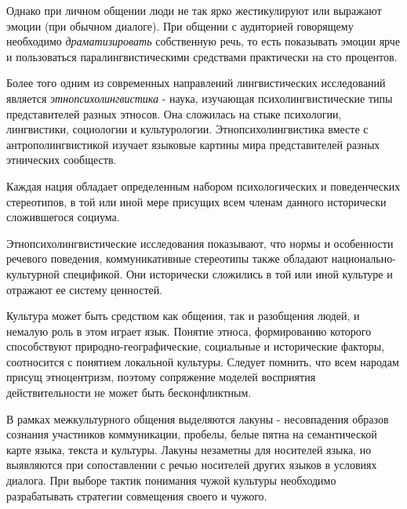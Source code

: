  Однако при личном общении люди не так ярко жестикулируют или выражают эмоции (при обычном диалоге). 
 При общении с аудиторией говорящему необходимо \textit{драматизировать} собственную речь, то есть показывать эмоции ярче и пользоваться паралингвистическими
 средствами практически на сто процентов.
 
 Более того одним из современных направлений лингвистических исследований является
 \textit{этнопсихолингвистика} - наука, изучающая психолингвистические типы представителей разных этносов. Она сложилась на стыке психологии, лингвистики, социологии и культурологии.
 Этнопсихолингвистика вместе с антрополингвистикой изучает языковые картины мира представителей разных этнических сообществ.
 
 Каждая нация обладает определенным набором психологических и поведенческих стереотипов, в той или иной мере присущих всем членам данного исторически сложившегося
 социума. 
 
 Этнопсихолингвистические исследования показывают, что нормы и особенности речевого поведения, коммуникативные стереотипы также обладают национально-культурной
 спецификой. Они исторически сложились в той или иной культуре и отражают ее систему
 ценностей.
 
 Культура может быть средством как общения, так и разобщения людей, и немалую роль в этом играет язык.
 Понятие этноса, формированию которого способствуют
 природно-географические, социальные и исторические факторы, соотносится с понятием локальной культуры. Следует помнить, что всем народам присущ этноцентризм, поэтому сопряжение моделей восприятия действительности не может быть бесконфликтным.
 
 В рамках межкультурного общения выделяются лакуны - несовпадения образов сознания участников коммуникации, пробелы, белые пятна на семантической карте языка, текста и
 культуры. Лакуны незаметны для носителей языка, но выявляются при сопоставлении с речью носителей других языков в условиях диалога. При выборе тактик понимания чужой культуры необходимо разрабатывать стратегии совмещения своего и чужого.

